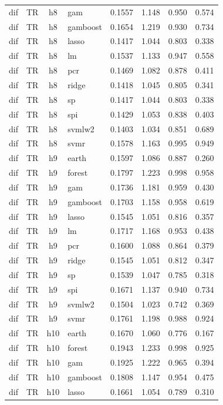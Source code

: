 \begin{ThreePartTable}
\begin{longtable}[t]{llclcccc}
dif & TR & h8 & gam & 0.1557 & 1.148 & 0.950 & 0.574\\
dif & TR & h8 & gamboost & 0.1654 & 1.219 & 0.930 & 0.734\\
dif & TR & h8 & lasso & 0.1417 & 1.044 & 0.803 & 0.338\\
dif & TR & h8 & lm & 0.1537 & 1.133 & 0.947 & 0.558\\
dif & TR & h8 & pcr & 0.1469 & 1.082 & 0.878 & 0.411\\
dif & TR & h8 & ridge & 0.1418 & 1.045 & 0.805 & 0.341\\
dif & TR & h8 & sp & 0.1417 & 1.044 & 0.803 & 0.338\\
dif & TR & h8 & spi & 0.1429 & 1.053 & 0.838 & 0.403\\
dif & TR & h8 & svmlw2 & 0.1403 & 1.034 & 0.851 & 0.689\\
dif & TR & h8 & svmr & 0.1578 & 1.163 & 0.995 & 0.949\\
\addlinespace
dif & TR & h9 & earth & 0.1597 & 1.086 & 0.887 & 0.260\\
dif & TR & h9 & forest & 0.1797 & 1.223 & 0.998 & 0.958\\
dif & TR & h9 & gam & 0.1736 & 1.181 & 0.959 & 0.430\\
dif & TR & h9 & gamboost & 0.1703 & 1.158 & 0.958 & 0.619\\
dif & TR & h9 & lasso & 0.1545 & 1.051 & 0.816 & 0.357\\
dif & TR & h9 & lm & 0.1717 & 1.168 & 0.953 & 0.438\\
dif & TR & h9 & pcr & 0.1600 & 1.088 & 0.864 & 0.379\\
dif & TR & h9 & ridge & 0.1545 & 1.051 & 0.812 & 0.347\\
dif & TR & h9 & sp & 0.1539 & 1.047 & 0.785 & 0.318\\
dif & TR & h9 & spi & 0.1671 & 1.137 & 0.940 & 0.734\\
dif & TR & h9 & svmlw2 & 0.1504 & 1.023 & 0.742 & 0.369\\
dif & TR & h9 & svmr & 0.1761 & 1.198 & 0.988 & 0.924\\
\addlinespace
dif & TR & h10 & earth & 0.1670 & 1.060 & 0.776 & 0.167\\
dif & TR & h10 & forest & 0.1943 & 1.233 & 0.998 & 0.925\\
dif & TR & h10 & gam & 0.1925 & 1.222 & 0.965 & 0.394\\
dif & TR & h10 & gamboost & 0.1808 & 1.147 & 0.954 & 0.475\\
dif & TR & h10 & lasso & 0.1661 & 1.054 & 0.789 & 0.310\\

\end{longtable}
\end{ThreePartTable}
